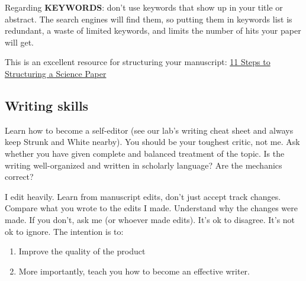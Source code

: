 \documentclass[
]{article}
\providecommand{\tightlist}{%
  \setlength{\itemsep}{0pt}\setlength{\parskip}{0pt}}
\begin{document}
Regarding \textbf{KEYWORDS}: don't use keywords that show up in your title or abstract. The search engines will find them, so putting them in keywords list is redundant, a waste of limited keywords, and limits the number of hits your paper will get.

This is an excellent resource for structuring your manuscript: \href{https://www.elsevier.com/connect/11-steps-to-structuring-a-science-paper-editors-will-take-seriously}{11 Steps to Structuring a Science Paper}

\hypertarget{writing-skills}{%
\subsection{Writing skills}\label{writing-skills}}

Learn how to become a self-editor (see our lab's writing cheat sheet and always keep Strunk and White nearby). You should be your toughest critic, not me. Ask whether you have given complete and balanced treatment of the topic. Is the writing well-organized and written in scholarly language? Are the mechanics correct?

I edit heavily. Learn from manuscript edits, don't just accept track changes. Compare what you wrote to the edits I made. Understand why the changes were made. If you don't, ask me (or whoever made edits). It's ok to disagree. It's not ok to ignore. The intention is to:

\begin{enumerate}
\def\labelenumi{\arabic{enumi})}
\tightlist
\item
  Improve the quality of the product
\item
  More importantly, teach you how to become an effective writer.
\end{enumerate}
\end{document}
